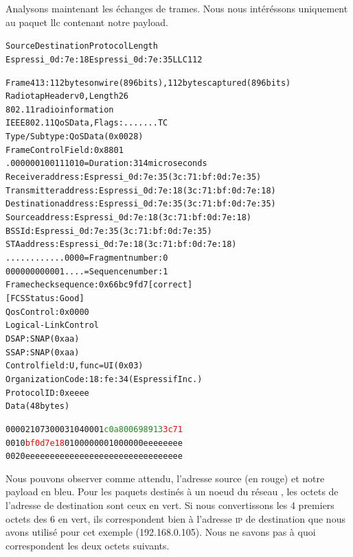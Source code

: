             Analysons maintenant les échanges de trames. Nous nous intéréssons uniquement au paquet llc contenant notre payload.
            \begin{alltt}
Source                Destination           Protocol Length
Espressi_0d:7e:18     Espressi_0d:7e:35     LLC      112   
            
Frame 413: 112 bytes on wire (896 bits), 112 bytes captured (896 bits)
Radiotap Header v0, Length 26
802.11 radio information
IEEE 802.11 QoS Data, Flags: .......TC
    Type/Subtype: QoS Data (0x0028)
    Frame Control Field: 0x8801
    .000 0001 0011 1010 = Duration: 314 microseconds
    Receiver address: Espressi_0d:7e:35 (3c:71:bf:0d:7e:35)
    Transmitter address: Espressi_0d:7e:18 (3c:71:bf:0d:7e:18)
    Destination address: Espressi_0d:7e:35 (3c:71:bf:0d:7e:35)
    Source address: Espressi_0d:7e:18 (3c:71:bf:0d:7e:18)
    BSS Id: Espressi_0d:7e:35 (3c:71:bf:0d:7e:35)
    STA address: Espressi_0d:7e:18 (3c:71:bf:0d:7e:18)
    .... .... .... 0000 = Fragment number: 0
    0000 0000 0001 .... = Sequence number: 1
    Frame check sequence: 0x66bc9fd7 [correct]
    [FCS Status: Good]
    Qos Control: 0x0000
Logical-Link Control
    DSAP: SNAP (0xaa)
    SSAP: SNAP (0xaa)
    Control field: U, func=UI (0x03)
    Organization Code: 18:fe:34 (Espressif Inc.)
    Protocol ID: 0xeeee
Data (48 bytes)

0000  21 07 30 00 31 04 00 01 \textcolor{ForestGreen}{c0 a8 00 69 89 13} \textcolor{red}{3c 71}
0010  \textcolor{red}{bf 0d 7e 18} 01 00 00 00 01 00 00 00 ee ee ee ee
0020  ee ee ee ee ee ee ee ee ee ee ee ee ee ee ee ee
            \end{alltt}
            Nous pouvons observer comme attendu, l'adresse source (en rouge) et notre payload en bleu.
            Pour les paquets destinés à un noeud du réseau \espmesh, les octets de l'adresse de destination
            sont ceux en vert. Si nous convertissons les 4 premiers octets des 6 en vert,
            ils correspondent bien à l'adresse \textsc{ip} de destination que nous avons utilisé pour cet exemple (192.168.0.105).
            Nous ne savons pas à quoi correspondent les deux octets suivants.
            


